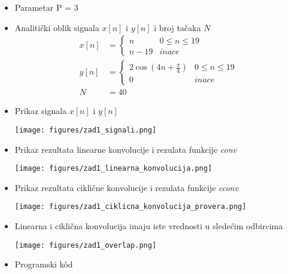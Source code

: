 
\begin{itemize}
    \item Parametar P = 3
    \item Analitički oblik signala $x[n]$ i $y[n]$ i broj tačaka $N$
    \begin{align*}
        x[n] &= \begin{cases} 
        n & 0 \leq n \leq 19 \\
        n - 19 & inace
        \end{cases} \\
        y[n] &= \begin{cases}
            2\cos(4n + \frac{\pi}{4}) & 0 \leq n \leq 19 \\
            0 & inace
        \end{cases}\\
        N &= 40
    \end{align*}
    \item Prikaz signala $x[n]$ i $y[n]$
    
        \begin{center}
            \texttt{[image: figures/zad1\_signali.png]}
        \end{center}
    
    \item Prikaz rezultata linearne konvolucije i rezulata funkcije \textit{conv}
    	
        \begin{center}
            \texttt{[image: figures/zad1\_linearna\_konvolucija.png]}
        \end{center}
        
    \item Prikaz rezultata ciklične konvolucije i rezulata funkcije \textit{cconv}
    
        \begin{center}
            \texttt{[image: figures/zad1\_ciklicna\_konvolucija\_provera.png]}
        \end{center}
        

    \item Linearna i ciklična konvolucija imaju iste vrednosti u sledećim odbircima
    
        \begin{center}
            \texttt{[image: figures/zad1\_overlap.png]}
        \end{center}
    
    \item{Programski k\^{o}d}
    
  
\end{itemize}

